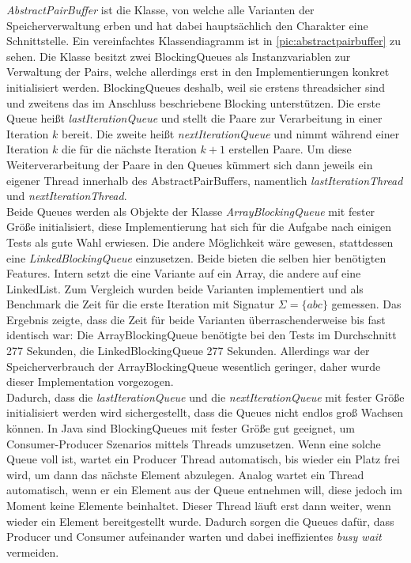 \documentclass[12pt,a4paper]{article}
\begin{document}
\textit{AbstractPairBuffer} ist die Klasse, von welche alle Varianten der Speicherverwaltung erben und hat dabei hauptsächlich den Charakter eine Schnittstelle. Ein vereinfachtes Klassendiagramm ist in \autoref{pic:abstractpairbuffer} zu sehen. Die Klasse besitzt zwei BlockingQueues als Instanzvariablen zur Verwaltung der Pairs, welche allerdings erst in den Implementierungen konkret initialisiert werden.  BlockingQueues deshalb, weil sie erstens threadsicher sind und zweitens das im Anschluss beschriebene Blocking unterstützen. Die erste Queue heißt \textit{lastIterationQueue} und stellt  die Paare zur Verarbeitung in einer Iteration $k$ bereit. Die zweite heißt \textit{nextIterationQueue} und nimmt während einer Iteration $k$ die für die nächste Iteration $k+1$ erstellen Paare. Um diese Weiterverarbeitung der Paare in den Queues kümmert sich dann jeweils ein eigener Thread innerhalb des AbstractPairBuffers, namentlich \textit{lastIterationThread} und \textit{nextIterationThread}. \\
Beide Queues werden als Objekte der Klasse \textit{ArrayBlockingQueue} mit fester Größe initialisiert, diese Implementierung hat sich für die Aufgabe nach einigen Tests als gute Wahl erwiesen. Die andere Möglichkeit wäre gewesen, stattdessen eine \textit{LinkedBlockingQueue} einzusetzen. Beide bieten die selben hier benötigten Features. Intern setzt die eine Variante auf ein Array, die andere auf eine LinkedList. Zum Vergleich wurden beide Varianten implementiert und als Benchmark die Zeit für die erste Iteration mit Signatur $\Sigma=\{abc\}$ gemessen. Das Ergebnis zeigte, dass die Zeit für beide Varianten überraschenderweise bis fast identisch war: Die ArrayBlockingQueue benötigte bei den Tests im Durchschnitt 277 Sekunden, die LinkedBlockingQueue 277 Sekunden. Allerdings war der Speicherverbrauch der ArrayBlockingQueue wesentlich geringer, daher wurde dieser Implementation vorgezogen. \\
Dadurch, dass die \textit{lastIterationQueue} und die \textit{nextIterationQueue} mit fester Größe initialisiert werden wird sichergestellt, dass die Queues nicht endlos groß Wachsen können. In Java sind BlockingQueues mit fester Größe gut geeignet, um Consumer-Producer Szenarios  mittels Threads umzusetzen. Wenn eine solche Queue voll ist, wartet ein Producer Thread automatisch, bis wieder ein Platz frei wird, um dann das nächste Element abzulegen. Analog wartet ein Thread automatisch, wenn er ein Element aus der Queue entnehmen will, diese jedoch im Moment keine Elemente beinhaltet. Dieser Thread läuft erst dann weiter, wenn wieder ein Element bereitgestellt wurde. Dadurch sorgen die Queues dafür, dass Producer und Consumer aufeinander warten und dabei ineffizientes \textit{busy wait} vermeiden.\\
\end{document}

